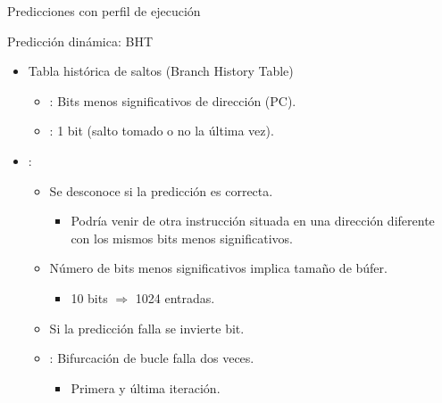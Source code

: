 \begin{frame}[t]{Predicciones con perfil de ejecución}
\end{frame}

\begin{frame}[t]{Predicción dinámica: BHT}
\begin{itemize}
  \item Tabla histórica de saltos (Branch History Table)
    \begin{itemize}
      \item {}: Bits menos significativos de dirección (PC).
      \item {}: 1 bit (salto tomado o no la última vez).
    \end{itemize}
  \item {}:
    \begin{itemize}
      \item Se desconoce si la predicción es correcta.
        \begin{itemize}
          \item Podría venir de otra instrucción situada en una dirección
                diferente con los mismos bits menos significativos.
        \end{itemize}
        \item Número de bits menos significativos implica tamaño de búfer.
          \begin{itemize}
            \item 10 bits $\Rightarrow$ 1024 entradas.
          \end{itemize}
        \item Si la predicción falla se invierte bit.
        \item {}: Bifurcación de bucle falla dos veces.
          \begin{itemize}
            \item Primera y última iteración.
          \end{itemize}
    \end{itemize}
\end{itemize}
\end{frame}

